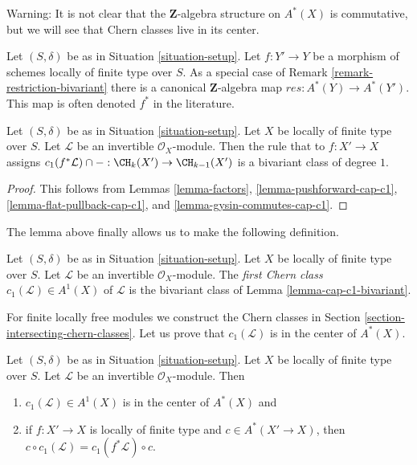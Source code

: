 \noindent
Warning: It is not clear that the $\mathbf{Z}$-algebra structure
on $A^*(X)$ is commutative, but we will see that Chern classes live
in its center.

\begin{remark}
\label{remark-pullback-cohomology}
Let $(S, \delta)$ be as in Situation \ref{situation-setup}.
Let $f : Y' \to Y$ be a morphism of schemes locally of finite type over $S$.
As a special case of Remark \ref{remark-restriction-bivariant}
there is a canonical $\mathbf{Z}$-algebra map $res : A^*(Y) \to A^*(Y')$.
This map is often denoted $f^*$ in the literature.
\end{remark}

\begin{lemma}
\label{lemma-cap-c1-bivariant}
Let $(S, \delta)$ be as in Situation \ref{situation-setup}.
Let $X$ be locally of finite type over $S$.
Let $\mathcal{L}$ be an invertible $\mathcal{O}_X$-module.
Then the rule that to $f : X' \to X$ assigns
$c_1(f^*\mathcal{L}) \cap - : \CH_k(X') \to \CH_{k - 1}(X')$
is a bivariant class of degree $1$.
\end{lemma}

\begin{proof}
This follows from Lemmas \ref{lemma-factors},
\ref{lemma-pushforward-cap-c1},
\ref{lemma-flat-pullback-cap-c1}, and
\ref{lemma-gysin-commutes-cap-c1}.
\end{proof}

\noindent
The lemma above finally allows us to make the following definition.

\begin{definition}
\label{definition-first-chern-class}
Let $(S, \delta)$ be as in Situation \ref{situation-setup}. Let $X$
be locally of finite type over $S$. Let $\mathcal{L}$ be an invertible
$\mathcal{O}_X$-module. The {\it first Chern class}
$c_1(\mathcal{L}) \in A^1(X)$ of $\mathcal{L}$
is the bivariant class of Lemma \ref{lemma-cap-c1-bivariant}.
\end{definition}

\noindent
For finite locally free modules we construct the Chern classes in
Section \ref{section-intersecting-chern-classes}.
Let us prove that $c_1(\mathcal{L})$ is in the center of $A^*(X)$.

\begin{lemma}
\label{lemma-c1-center}
Let $(S, \delta)$ be as in Situation \ref{situation-setup}.
Let $X$ be locally of finite type over $S$.
Let $\mathcal{L}$ be an invertible $\mathcal{O}_X$-module.
Then
\begin{enumerate}
\item $c_1(\mathcal{L}) \in A^1(X)$ is in the center of $A^*(X)$ and
\item if $f : X' \to X$ is locally of finite type and $c \in A^*(X' \to X)$,
then $c \circ c_1(\mathcal{L}) = c_1(f^*\mathcal{L}) \circ c$.
\end{enumerate}
\end{lemma}

